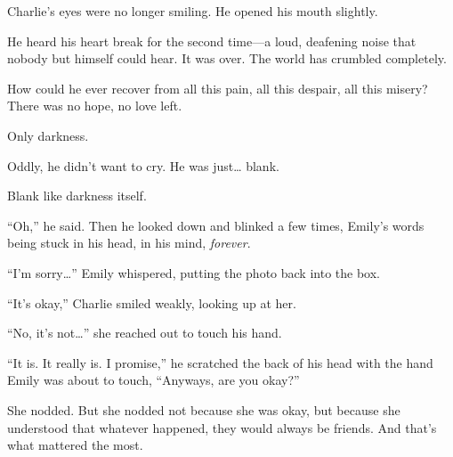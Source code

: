 Charlie's eyes were no longer smiling. He opened his mouth slightly.

He heard his heart break for the second time—a loud, deafening noise that nobody but himself could hear. It was over. The world has crumbled completely.

How could he ever recover from all this pain, all this despair, all this misery? There was no hope, no love left.

Only darkness.

Oddly, he didn't want to cry. He was just… blank.

Blank like darkness itself.

“Oh,” he said. Then he looked down and blinked a few times, Emily's words being stuck in his head, in his mind, \textit{forever}.

“I'm sorry…” Emily whispered, putting the photo back into the box.

“It's okay,” Charlie smiled weakly, looking up at her.

“No, it's not…” she reached out to touch his hand.

“It is. It really is. I promise,” he scratched the back of his head with the hand Emily was about to touch, “Anyways, are you okay?”

She nodded. But she nodded not because she was okay, but because she understood that whatever happened, they would always be friends. And that's what mattered the most.